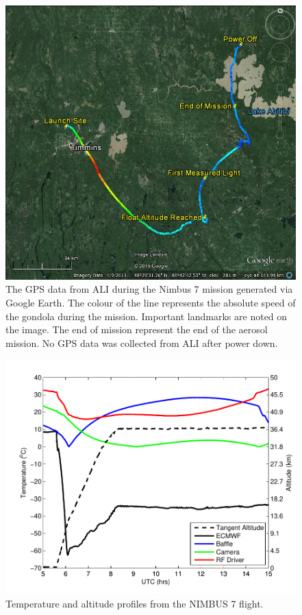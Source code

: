 \documentclass[12pt]{article}
\begin{document}
\newpage

\begin{figure}
    \includegraphics[width=1.0\textwidth]{./Images/5-1-AliGpsDataGoogleMaps.jpg}
    \caption{The GPS data from ALI during the Nimbus 7 mission generated via Google Earth. The colour of the line represents the absolute speed of the gondola during the mission. Important landmarks are noted on the image. The end of mission represent the end of the aerosol mission. No GPS data was collected from ALI after power down.}
    \label{fig:5.1:nimbus7FlightPath}
\end{figure}

\newpage

\begin{figure}
    \includegraphics[width=1.0\textwidth]{./Images/Temperatures.pdf}
    \caption{Temperature and altitude profiles from the NIMBUS 7 flight.}
    \label{fig:nimbus7Temps}
\end{figure}
\end{document}
